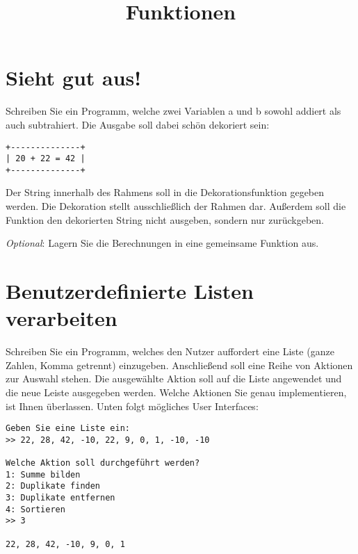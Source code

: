 

\title{Funktionen}

\ihead{}
\chead{}
\ohead{}
\ifoot{}
\cfoot{\pagemark}
\ofoot{}



\setlength{\parskip}{1em}
\setlength{\parindent}{0em}
\renewcommand{\baselinestretch}{1.15}



\docheader

\section{Sieht gut aus!}

Schreiben Sie ein Programm, welche zwei Variablen a und b sowohl addiert als auch subtrahiert. Die Ausgabe soll dabei schön dekoriert sein:

\begin{lstlisting}
+--------------+
| 20 + 22 = 42 |
+--------------+
\end{lstlisting}

Der String innerhalb des Rahmens soll in die Dekorationsfunktion gegeben werden. Die Dekoration stellt ausschließlich der Rahmen dar. Außerdem soll die Funktion den dekorierten String nicht ausgeben, sondern nur zurückgeben.

\textit{Optional}: Lagern Sie die Berechnungen in eine gemeinsame Funktion aus.



\section{Benutzerdefinierte Listen verarbeiten}

Schreiben Sie ein Programm, welches den Nutzer auffordert eine Liste (ganze Zahlen, Komma getrennt) einzugeben. Anschließend soll eine Reihe von Aktionen zur Auswahl stehen. Die ausgewählte Aktion soll auf die Liste angewendet und die neue Leiste ausgegeben werden. Welche Aktionen Sie genau implementieren, ist Ihnen überlassen. Unten folgt mögliches User Interfaces:

\begin{lstlisting}
Geben Sie eine Liste ein:
>> 22, 28, 42, -10, 22, 9, 0, 1, -10, -10

Welche Aktion soll durchgeführt werden?
1: Summe bilden
2: Duplikate finden
3: Duplikate entfernen
4: Sortieren
>> 3

22, 28, 42, -10, 9, 0, 1
\end{lstlisting}


